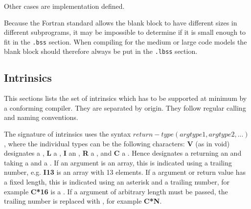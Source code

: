 Other cases are implementation defined.

Because the Fortran standard allows the blank  block to have
different sizes in different subprograms, it may be impossible to determine
if it is small enough to fit in the \texttt{.bss}
section.  When compiling for the medium or large code models the blank
 block should therefore always be put in the \texttt{.lbss}
section.

\subsection{Intrinsics}
This sections lists the set of intrinsics which has to be supported
at minimum by a conforming compiler.  They are separated by origin.
They follow regular calling and naming conventions.

The signature of intrinsics uses the syntax
$return-type(argtype1, argtype2, ...)$, where the individual types can
be the following characters: {\bf V} (as in void) designates a
, {\bf L} a , {\bf I} an ,
{\bf R} a , and {\bf C} a .
Hence  designates a  returning an
 and taking a  and a .
If an argument is an array, this is indicated using a trailing number,
e.g. {\bf I13} is an  array with 13 elements.
If a  argument or return value has a fixed length, this
is indicated using an asterisk and a trailing number, for example
{\bf C*16} is a .  If a 
argument of arbitrary length must be passed, the trailing number is
replaced with , for example {\bf C*N}.


